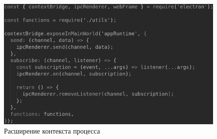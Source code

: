 \begin{figure}[H]
  \centering
  \includegraphics[height=0.2\textheight]{assets/images/practical/contextBridge.png}
  \caption{Расширение контекста процесса}
  \label{img:contextBridge}
\end{figure}

